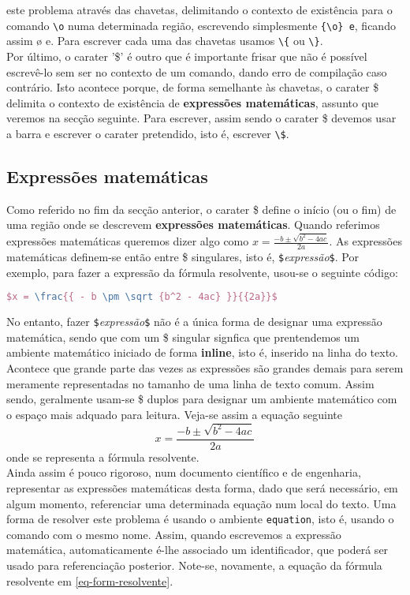 \documentclass[a4paper, onecolumn, 10pt]{report}
\begin{document}
este problema através das chavetas, delimitando o contexto de existência para o comando \texttt{\textbackslash o} numa determinada região, escrevendo simplesmente \texttt{\{\textbackslash o\} e},
ficando assim {\o} e. Para escrever cada uma das chavetas usamos \texttt{\textbackslash \{} ou \texttt{\textbackslash \}}.\\
Por último, o carater '\$' é outro que é importante frisar que não é possível escrevê-lo sem ser no contexto de um comando, dando erro de compilação caso contrário. Isto acontece
porque, de forma semelhante às chavetas, o carater \$ delimita o contexto de existência de \textbf{expressões matemáticas}, assunto que veremos na secção seguinte. Para escrever, assim sendo
o carater \$ devemos usar a barra e escrever o carater pretendido, isto é, escrever \texttt{\textbackslash \$}.

\subsection{Expressões matemáticas}
Como referido no fim da secção anterior, o carater \$ define o início (ou o fim) de uma região onde se descrevem \textbf{expressões matemáticas}. Quando referimos
expressões matemáticas queremos dizer algo como $x = \frac{{ - b \pm \sqrt {b^2 - 4ac} }}{{2a}}$. As expressões matemáticas definem-se então entre \$ singulares, isto é,
\texttt{\$}\textit{expressão}\texttt{\$}. Por exemplo, para fazer a expressão da fórmula resolvente, usou-se o seguinte código:

\begin{lstlisting}[language=TeX]
$x = \frac{{ - b \pm \sqrt {b^2 - 4ac} }}{{2a}}$
\end{lstlisting}

No entanto, fazer \texttt{\$}\textit{expressão}\texttt{\$} não é a única forma de designar uma expressão matemática, sendo que com um \$ singular signfica que prentendemos um
ambiente matemático iniciado de forma \textbf{inline}, isto é, inserido na linha do texto. Acontece que grande parte das vezes as expressões são grandes demais para serem
meramente representadas no tamanho de uma linha de texto comum. Assim sendo, geralmente usam-se \$ duplos para designar um ambiente matemático com o espaço mais adquado para
leitura. Veja-se assim a equação seguinte $$x = \frac{{ - b \pm \sqrt {b^2 - 4ac} }}{{2a}}$$ onde se representa a fórmula resolvente. \\
Ainda assim é pouco rigoroso, num documento científico e de engenharia, representar as expressões matemáticas desta forma, dado que será necessário, em algum momento, referenciar
uma determinada equação num local do texto. Uma forma de resolver este problema é usando o ambiente \texttt{equation}, isto é, usando o comando com o mesmo nome. Assim, quando
escrevemos a expressão matemática, automaticamente é-lhe associado um identificador, que poderá ser usado para referenciação posterior. Note-se, novamente, a equação da fórmula
resolvente em \ref{eq-form-resolvente}.
\end{document}

